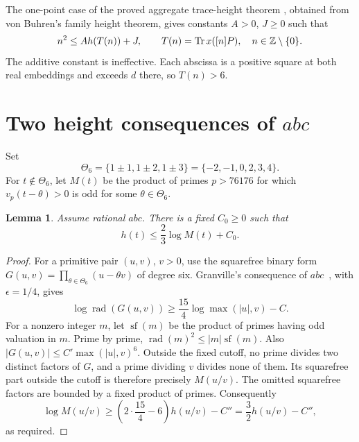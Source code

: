 \documentclass[11pt,a4paper]{article}
\newtheorem{lemma}[theorem]{Lemma}
\DeclareMathOperator{\Tr}{Tr}\DeclareMathOperator{\Nm}{N}
\DeclareMathOperator{\rad}{rad}
\begin{document}
The one-point case of the proved aggregate trace-height theorem
\cite{Trace}, obtained from von Buhren's family height theorem, gives
constants $A>0$, $J\ge0$ such that
\begin{equation}\label{eq:traceheight}
 n^2\le A h(T(n))+J,\qquad
 T(n)=\Tr x([n]P),\quad n\in\Z\setminus\{0\}.
\end{equation}
The additive constant is ineffective. Each abscissa is a positive square
at both real embeddings and exceeds $d$ there, so $T(n)>6$.

\section{Two height consequences of $abc$}

Set
\[
 \Theta_6=\{1\pm1,1\pm2,1\pm3\}
          =\{-2,-1,0,2,3,4\}.
\]
For $t\notin\Theta_6$, let $M(t)$ be the product of primes $p>76176$
for which $v_p(t-\theta)>0$ is odd for some $\theta\in\Theta_6$.

\begin{lemma}\label{lem:contact}
Assume rational $abc$. There is a fixed $C_0\ge0$ such that
\[
                         h(t)\le\frac23\log M(t)+C_0.
\]
\end{lemma}
\begin{proof}
For a primitive pair $(u,v)$, $v>0$, use the squarefree binary form
$G(u,v)=\prod_{\theta\in\Theta_6}(u-\theta v)$ of degree six.
Granville's consequence of $abc$~\cite[Proposition~1]{Granville},
with $\epsilon=1/4$, gives
\[
 \log\rad(G(u,v))\ge\frac{15}{4}\log\max(|u|,v)-C.
\]
For a nonzero integer $m$, let $\operatorname{sf}(m)$ be the product
of primes having odd valuation in $m$. Prime by prime,
$\rad(m)^2\le |m|\operatorname{sf}(m)$.
Also $|G(u,v)|\le C'\max(|u|,v)^6$.
Outside the fixed cutoff, no prime divides two distinct factors of
$G$, and a prime dividing $v$ divides none of them. Its squarefree
part outside the cutoff is therefore precisely $M(u/v)$.
The omitted squarefree factors are bounded by a fixed product of primes.
Consequently
\[
 \log M(u/v)\ge\left(2\cdot\frac{15}{4}-6\right)h(u/v)-C''
                 =\frac32h(u/v)-C'',
\]
as required.
\end{proof}
\end{document}
